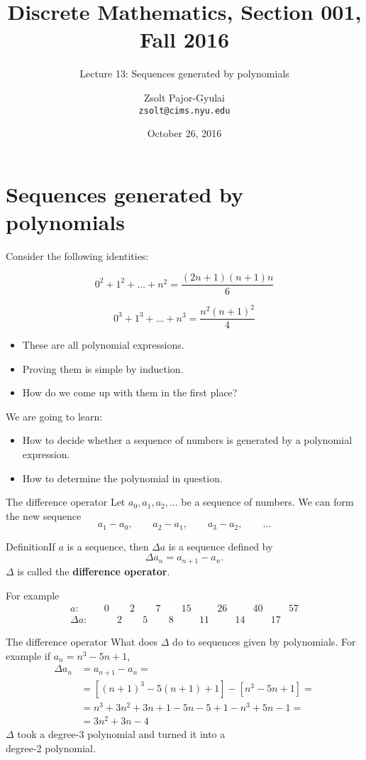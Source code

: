 \documentclass{beamer}
\title{Discrete Mathematics, Section 001, Fall 2016}
\subtitle{Lecture 13: Sequences generated by polynomials}
\author[Zsolt]{Zsolt Pajor-Gyulai \\ \texttt{zsolt@cims.nyu.edu}}
\date{October 26, 2016}
\institute[NYU] 
{
\normalsize Courant Institute of Mathematical Sciences
}
\def\bl[#1]#2{\begin{block}{#1}#2\end{block}}
\def\itemb{\begin{itemize}}
\def\iteme{\end{itemize}}
\begin{document}
\begin{frame}
  \titlepage
\end{frame}


\section{Sequences generated by polynomials}

\begin{frame}
Consider the following identities:
\bl[]{
\[
0^2+1^2+\dots+n^2=\frac{(2n+1)(n+1)n}{6}
\]}
\bl[]{
\[
0^3+1^3+\dots+n^3=\frac{n^2(n+1)^2}{4}
\]}
\itemb
\item These are all polynomial expressions.
\item Proving them is simple by induction.
\item How do we come up with them in the first place?
\iteme
We are going to learn:
\itemb
\item How to decide whether a sequence of numbers is generated by a polynomial expression.
\item How to determine the polynomial in question.
\iteme
\end{frame}

\begin{frame}{The difference operator}
Let $a_0,a_1,a_2,\dots$ be a sequence of numbers. We can form the new sequence
\[
a_1-a_0,\qquad a_2-a_1,\qquad a_3-a_2,\qquad\dots
\]
\bl[Definition]{If $a$ is a sequence, then $\Delta a$ is a sequence defined by 
\[
\Delta a_n=a_{n+1}-a_n.
\]
$\Delta$ is called the \textbf{difference operator}.}
For example
\[
\begin{array}{rcccccccccccccc}
a:&&0&&2&&7&&15&&26&&40&&57\\
\Delta a:&&&2&&5&&8&&11&&14&&17
\end{array}
\]
\end{frame}

\begin{frame}{The difference operator}
What does $\Delta$ do to sequences given by polynomials. For example if $a_n=n^3-5n+1$,
\begin{align*}
\Delta a_n&=a_{n+1}-a_n=\\
&=[(n+1)^3-5(n+1)+1]-[n^3-5n+1]=\\
&=n^3+3n^2+3n+1-5n-5+1-n^3+5n-1=\\
&=3n^2+3n-4
\end{align*}
\center\color{red} $\Delta$ took a degree-3 polynomial and turned it into a \\degree-2 polynomial.
\end{frame}
\end{document}
